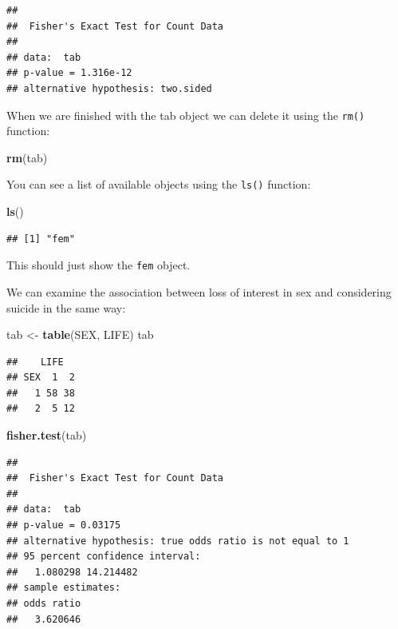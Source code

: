 \documentclass[12pt,]{book}
\newenvironment{Shaded}{\begin{snugshade}}{\end{snugshade}}
\newcommand{\KeywordTok}[1]{\textcolor[rgb]{0.13,0.29,0.53}{\textbf{#1}}}
\newcommand{\StringTok}[1]{\textcolor[rgb]{0.31,0.60,0.02}{#1}}
\newcommand{\NormalTok}[1]{#1}
\theoremstyle{definition}
\theoremstyle{definition}
\theoremstyle{definition}
\theoremstyle{remark}
\begin{document}
\begin{verbatim}
## 
##  Fisher's Exact Test for Count Data
## 
## data:  tab
## p-value = 1.316e-12
## alternative hypothesis: two.sided
\end{verbatim}

When we are finished with the tab object we can delete it using the
\texttt{rm()} function:

\begin{Shaded}
\begin{Highlighting}[]
\KeywordTok{rm}\NormalTok{(tab)}
\end{Highlighting}
\end{Shaded}

You can see a list of available objects using the \texttt{ls()}
function:

\begin{Shaded}
\begin{Highlighting}[]
\KeywordTok{ls}\NormalTok{()}
\end{Highlighting}
\end{Shaded}

\begin{verbatim}
## [1] "fem"
\end{verbatim}

This should just show the \texttt{fem} object.

We can examine the association between loss of interest in sex and
considering suicide in the same way:

\begin{Shaded}
\begin{Highlighting}[]
\NormalTok{tab <-}\StringTok{ }\KeywordTok{table}\NormalTok{(SEX, LIFE)}
\NormalTok{tab}
\end{Highlighting}
\end{Shaded}

\begin{verbatim}
##    LIFE
## SEX  1  2
##   1 58 38
##   2  5 12
\end{verbatim}

\begin{Shaded}
\begin{Highlighting}[]
\KeywordTok{fisher.test}\NormalTok{(tab)}
\end{Highlighting}
\end{Shaded}

\begin{verbatim}
## 
##  Fisher's Exact Test for Count Data
## 
## data:  tab
## p-value = 0.03175
## alternative hypothesis: true odds ratio is not equal to 1
## 95 percent confidence interval:
##   1.080298 14.214482
## sample estimates:
## odds ratio 
##   3.620646
\end{verbatim}
\end{document}
